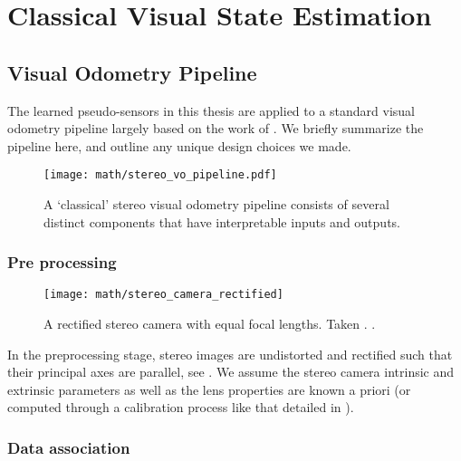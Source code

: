\chapter{Classical Visual State Estimation}

\section{Visual Odometry Pipeline}

The learned pseudo-sensors in this thesis are applied to a standard visual odometry pipeline largely based on the work of \cite{furgale_phd11}. We briefly summarize the pipeline here, and outline any unique design choices we made.


\begin{figure}
\begin{center}
		\texttt{[image: math/stereo\_vo\_pipeline.pdf]}
		\caption{A `classical' stereo visual odometry pipeline consists of several distinct components that have interpretable inputs and outputs.}
  	\label{fig:math_stereo_vo_pipeline}
\end{center}
\end{figure}

\subsection{Pre processing}

\begin{figure}
\begin{center}
		\texttt{[image: math/stereo\_camera\_rectified]}
		\caption{A rectified stereo camera with equal focal lengths. Taken \cite{furgale_phd11}. .}
  	\label{fig:math_stereo_camera}
\end{center}
\end{figure}

In the preprocessing stage, stereo images are undistorted and rectified such that their principal axes are parallel, see . We assume the stereo camera intrinsic and extrinsic parameters as well as the lens properties are known a priori (or computed through a calibration process like that detailed in \cite{kelly_phd2011}).

\subsection{Data association}

